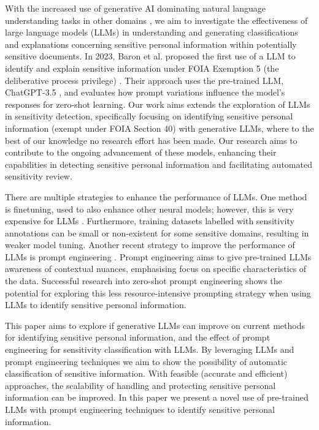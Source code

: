 With the increased use of generative AI dominating natural language understanding tasks in other domains \cite{qiu2020pre, adiwardana2020towards, roller2020recipes, openai2023gpt}, we aim to investigate the effectiveness of large language models (LLMs) in understanding and generating classifications and explanations concerning sensitive personal information within potentially sensitive documents. In 2023, Baron et al. proposed the first use of a LLM to identify and explain sensitive information under FOIA Exemption 5 (the deliberative process privilege) \cite{baron2023using}. Their approach uses the pre-trained LLM, ChatGPT-3.5 \cite{brown2020language}, and evaluates how prompt variations influence the model's responses for zero-shot learning. Our work aims extends the exploration of LLMs in sensitivity detection, specifically focusing on identifying sensitive personal information (exempt under FOIA Section 40) with generative LLMs, where to the best of our knowledge no research effort has been made. Our research aims to contribute to the ongoing advancement of these models, enhancing their capabilities in detecting sensitive personal information and facilitating automated sensitivity review.

There are multiple strategies to enhance the performance of LLMs. One method is finetuning, used to also enhance other neural models; however, this is very expensive for LLMs \cite{naveed2023comprehensive}. Furthermore, training datasets labelled with sensitivity annotations can be small or non-existent for some sensitive domains, resulting in weaker model tuning. Another recent strategy to improve the performance of LLMs is prompt engineering \cite{liu2023pre}. Prompt engineering aims to give pre-trained LLMs awareness of contextual nuances, emphasising focus on specific characteristics of the data. Successful research into zero-shot prompt engineering \cite{wei2023zero, kojima2022large} shows the potential for exploring this less resource-intensive prompting strategy when using LLMs to identify sensitive personal information.

This paper aims to explore if generative LLMs can improve on current methods for identifying sensitive personal information, and the effect of prompt engineering for sensitivity classification with LLMs. By leveraging LLMs and prompt engineering techniques we aim to show the possibility of automatic classification of sensitive information. With feasible (accurate and efficient) approaches, the scalability of handling and protecting sensitive personal information can be improved. In this paper we present a novel use of pre-trained LLMs with prompt engineering techniques to identify sensitive personal information.

